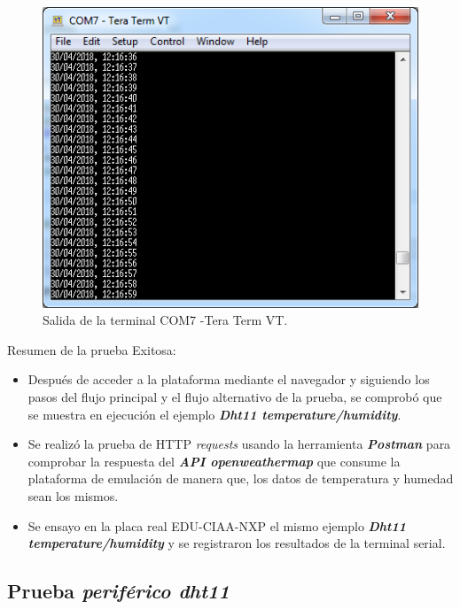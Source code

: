 \begin{figure}[ht]
	\centering
	\includegraphics[scale=.90]{./Figures/rtcprintfPlaca.png}
	\caption{Salida de la terminal COM7 -Tera Term VT.}
	\label{fig:rtcprintfPlaca}
\end{figure}

\hfill \break
\hfill \break
\hfill \break
\hfill \break
\hfill \break
\hfill \break
\hfill \break
\hfill \break
\hfill \break
\hfill \break
\hfill \break

Resumen de la prueba Exitosa:
\begin{itemize}
	\item Después de acceder a la plataforma mediante el navegador y siguiendo los pasos del flujo principal y el flujo alternativo de la prueba, se comprobó que se muestra en ejecución el ejemplo \textit{\textbf{Dht11 temperature/humidity}}.
	\item Se realizó la prueba de HTTP \textit{requests} usando la herramienta \textit{\textbf{Postman}} para comprobar la respuesta del \textit{\textbf{API openweathermap}} que consume la plataforma de emulación de manera que, los datos de temperatura y humedad sean los mismos.
	\item Se ensayo en la placa real EDU-CIAA-NXP  el mismo ejemplo \textit{\textbf{Dht11 temperature/humidity}} y se registraron los resultados de la terminal serial.

\end{itemize}


\subsection{Prueba \textit{\textbf{periférico dht11}} }

